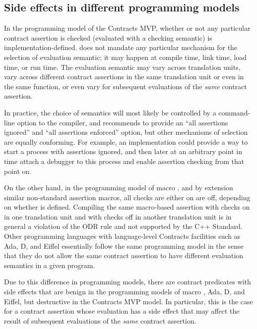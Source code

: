 \subsection{Side effects in different programming models}
\label{subsec:models}

In the programming model of the Contracts MVP, whether or not any particular contract assertion is checked (evaluated with a checking semantic) is implementation-defined. \cite{P2900R6} does not mandate any particular mechanism for the selection of evaluation semantic: it may happen at compile time, link time, load time, or run time. The evaluation semantic may vary across translation units, vary across different contract assertions in the same translation unit or even in the same function, or even vary for subsequent evaluations of the \emph{same} contract assertion.

In practice, the choice of semantics will most likely be controlled by a command-line option to the compiler, and \cite{P2900R6} recommends to provide an ``all assertions ignored'' and ``all assertions enforced'' option, but other mechanisms of selection are equally conforming. For example, an implementation could provide a way to start a process with assertions ignored, and then later at an arbitrary point in time attach a debugger to this process and enable assertion checking from that point on. 

On the other hand, in the programming model of macro , and by extension similar non-standard assertion macros,  all checks are either on are off, depending on whether  is defined. Compiling the same macro-based assertion with checks on in one translation unit and with checks off in another translation unit is in general a violation of the ODR rule and not supported by the C++ Standard. Other programming languages with language-level Contracts facilities such as Ada, D, and Eiffel essentially follow the same programming model in the sense that they do not allow the same contract assertion to have different evaluation semantics in a given program.

Due to this difference in programming models, there are contract predicates with side effects that are benign in the programming models of macro , Ada, D, and Eiffel, but destructive in the Contracts MVP model. In particular, this is the case for a contract assertion whose evaluation has a side effect that may affect the result of subsequent evaluations of the \emph{same} contract assertion.

